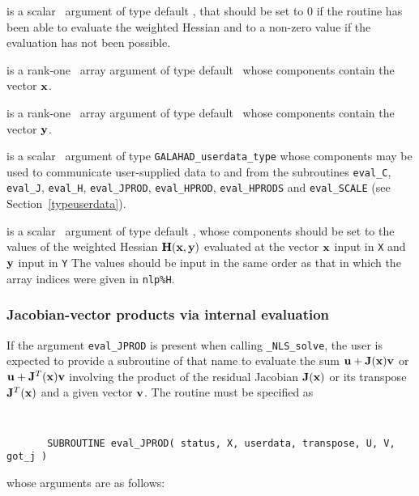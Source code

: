 \documentclass{galahad}
\newcommand{\packagename}{NLS}
\newcommand{\fullpackagename}{\libraryname\_\packagename}
\newcommand{\solver}{{\tt \fullpackagename\_solve}}
\begin{document}
\begin{description}
 is a scalar \intentout\ argument of type default \integer,
that should be set to 0 if the routine has been able to evaluate
the weighted Hessian
and to a non-zero value if the evaluation has not been possible.

 is a rank-one \intentin\ array argument of type default \realdp\
whose components contain the vector ${\mathbf{x}}$.

 is a rank-one \intentin\ array argument of type default \realdp\
whose components contain the vector ${\mathbf{y}}$.

 is a scalar \intentinout\ argument of type
{\tt GALAHAD\_userdata\_type} whose components may be used
to communicate user-supplied data to and from the subroutines
{\tt eval\_C}, {\tt eval\_J}, {\tt eval\_H}, {\tt eval\_JPROD},
{\tt eval\_HPROD}, {\tt eval\_HPRODS} and {\tt eval\_SCALE}
(see Section~\ref{typeuserdata}).

 is a scalar \intentout\ argument of type default \realdp,
whose components should be set to the values
of the weighted Hessian ${\mathbf{H}}({\mathbf{x}},{\mathbf{y}})$
evaluated at the vector ${\mathbf{x}}$ input in {\tt X}
and ${\mathbf{y}}$ input in {\tt Y} The values should
be input in the same order as that in which the array indices were
given in {\tt nlp\%H}.

\end{description}


\subsubsection{Jacobian-vector products via internal evaluation\label{jvfv}}

If the argument {\tt eval\_JPROD} is present when calling \solver, the
user is expected to provide a subroutine of that name to evaluate the
sum ${\mathbf{u}} + {\mathbf{J}}({\mathbf{x}}) {\mathbf{v}}$ or ${\mathbf{u}} + {\mathbf{J}}^T({\mathbf{x}}){\mathbf{v}}$ involving the
product of the residual Jacobian ${\mathbf{J}}({\mathbf{x}})$ or its transpose ${\mathbf{J}}^T({\mathbf{x}})$
and a given vector ${\mathbf{v}}$.
The routine must be specified as

\def\baselinestretch{0.8}
{\tt
\begin{verbatim}
       SUBROUTINE eval_JPROD( status, X, userdata, transpose, U, V, got_j )
\end{verbatim} }
\def\baselinestretch{1.0}
\noindent whose arguments are as follows:
\end{document}
